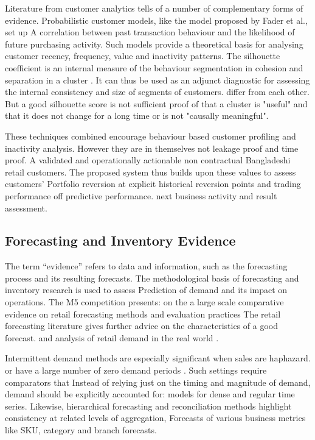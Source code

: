 \documentclass[a4paper,11pt,oneside]{book}
\theoremstyle{plain}
\theoremstyle{definition}
\theoremstyle{remark}
\begin{document}
Literature from customer analytics tells of a number of complementary forms of evidence. Probabilistic customer models, like the model proposed by Fader et al., set up A correlation between past transaction behaviour and the likelihood of future purchasing activity. Such models provide a theoretical basis for analysing customer recency, frequency, value and inactivity patterns. The silhouette coefficient is an internal measure of the behaviour segmentation in cohesion and separation in a cluster \cite{rousseeuw1987silhouettes}. It can thus be used as an adjunct diagnostic for assessing the internal consistency and size of segments of customers. differ from each other. But a good silhouette score is not sufficient proof of that a cluster is "useful" and that it does not change for a long time or is not "causally meaningful".

These techniques combined encourage behaviour based customer profiling and inactivity analysis. However they are in themselves not leakage proof and time proof. A validated and operationally actionable non contractual Bangladeshi retail customers. The proposed system thus builds upon these values to assess customers' Portfolio reversion at explicit historical reversion points and trading performance off predictive performance. next business activity and result assessment.

\subsection{Forecasting and Inventory Evidence}

The term “evidence” refers to data and information, such as the forecasting process and its resulting forecasts. The methodological basis of forecasting and inventory research is used to assess Prediction of demand and its impact on operations. The M5 competition presents: on the a large scale comparative evidence on retail forecasting methods and evaluation practices \cite{makridakis2022m5} The retail forecasting literature gives further advice on the characteristics of a good forecast. and analysis of retail demand in the real world \cite{fildes2022retail}.

Intermittent demand methods are especially significant when sales are haphazard. or have a large number of zero demand periods \cite{croston1972intermittent,syntetos2005intermittent}. Such settings require comparators that Instead of relying just on the timing and magnitude of demand, demand should be explicitly accounted for: models for dense and regular time series. Likewise, hierarchical forecasting and reconciliation methods highlight consistency at related levels of aggregation, Forecasts of various business metrics like SKU, category and branch forecasts.
\end{document}
